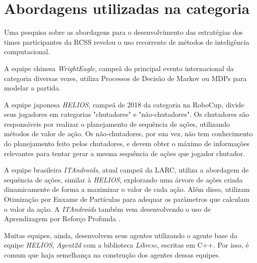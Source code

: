 \section{Abordagens utilizadas na categoria}
\par Uma pesquisa sobre as abordagens para o desenvolvimento das estratégias dos times participantes da RCSS revelou o uso recorrente de métodos de inteligência computacional.
\par A equipe chinesa \textit{WrightEagle}, campeã do principal evento internacional da categoria diversas vezes, utiliza Processos de Decisão de Markov ou MDPs para modelar a partida\cite{bai2015online}.
\par A equipe japonesa \textit{HELIOS}, campeã de 2018 da categoria na RoboCup, divide seus jogadores em categorias "chutadores" e "não-chutadores".
Os chutadores são responsáveis por realizar o planejamento de sequência de ações, utilizando métodos de valor de ação.
Os não-chutadores, por sua vez, não tem conhecimento do planejamento feito pelos chutadores, e devem obter o máximo de informações relevantes para tentar gerar a mesma sequência de ações que jogador chutador\cite{nakashima2018helios2018}.
\par A equipe brasileira \textit{ITAndroids}, atual campeã da LARC, utiliza a abordagem de sequência de ações, similar à \textit{HELIOS}, explorando uma árvore de ações criada dinamicamente de forma a maximizar o valor de cada ação. Além disso, utilizam Otimização por Enxame de Partículas \cite{melloitandroids} para adequar os parâmetros que calculam o valor da ação. A \textit{ITAndroids} também vem desenvolvendo o uso de Aprendizagem por Reforço Profunda \cite{maximoitandroids}.
\par Muitas equipes, ainda, desenvolvem seus agentes utilizando o agente base da equipe \textit{HELIOS}, \textit{Agent2d} com a biblioteca \textit{Librcsc}, escritas em C++. Por isso, é comum que haja semelhança na construção dos agentes dessas equipes.
